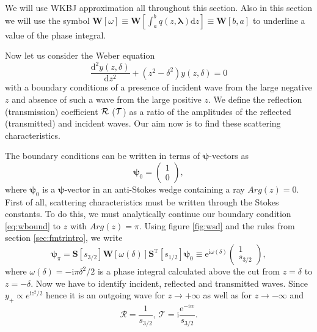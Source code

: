 \documentclass[atmp]{ipart_v1}
\def\rmd{\mathrm{d}}
\def\rme{\mathrm{e}}
\def\rmi{\mathrm{i}}
\def\lmbd{\bm{\lambda}}
\def\psii{\bm\psi}
\def\S{\bm{S}}
\def\W{\bm{W}}
\def\T{\mathrm{T}}
\def\w{\omega}
\newcommand\eref[1]{\eqref{#1}}
\newcommand\fref[1]{figure \ref{#1}}
\newcommand\sref[1]{section \ref{#1}}
\newcommand\phsintgrnd[1][z]{q(#1,\lmbd)}
\newcommand\phsintgrl[3][z]{\int_{#2}^{#3} \phsintgrnd[#1] \rmd #1}
\begin{document}
We will use WKBJ approximation all throughout this section. Also in this section we will use the symbol 
$\W[\w] \equiv \W \left[\phsintgrl{a}{b} \right] \equiv \W[b,a]$ to underline a value of the phase integral.

Now let us consider the Weber equation
\begin{equation}
\frac{\rmd^2 y(z,\delta)}{\rmd z^2}+(z^2-\delta^2)y(z,\delta)=0
\label{eq:weber}
\end{equation}
with a boundary conditions of a presence of incident wave from the large negative $z$ and absence of such 
a wave from the large positive $z$. We define the reflection (transmission) coefficient $\rm{\mathcal{R}}$ 
($\rm{\mathcal{T}}$) as a ratio of the amplitudes of the reflected (transmitted) and incident waves. 
Our aim now is to find these scattering characteristics.

The boundary conditions can be written in terms of $\psii$-vectors as
\begin{equation}
\psii_0 = \left(\begin{array}{*{2}{c}} 1 \\ 0 \end{array}\right),
\label{eq:wbound}
\end{equation}
where $\psii_0$ is a $\psii$-vector in an anti-Stokes wedge containing a ray $Arg(z)=0$.
First of all, scattering characteristics must be written through the 
Stokes constants. To do this, we must analytically continue our boundary 
condition \eref{eq:wbound} to $z$ with $Arg(z)=\pi$. 
Using \fref{fig:wsd} and the rules from \sref{sec:fmtrintro}, we write
\begin{equation}
\psii_{\pi} = 
\S \left[ s_{3/2} \right]
\W \left[ \w(\delta) \right] 
\S^{\T} \left[ s_{1/2} \right] \psii_0 \equiv 
\rme^{\rmi \w(\delta)} \left(\begin{array}{*{2}{c}} 1 \\ s_{3/2} \end{array}\right),
\end{equation}
where $\w(\delta)=-\rmi\pi\delta^2/2$ is a phase integral calculated above the cut 
from $z=\delta$ to $z=-\delta$. Now we have to identify incident, reflected and transmitted waves. 
Since $y_+ \propto e^{\rmi z^2/2}$ hence it is 
an outgoing wave for $z \rightarrow +\infty$ as well as for $z \rightarrow -\infty$ and
\begin{equation}
\mathcal{R} = \frac{1}{s_{3/2}},\ \mathcal{T} = \rmi\frac{\rme^{-\rmi w}}{s_{3/2}}.
\label{eq:RT}
\end{equation}
\end{document}
